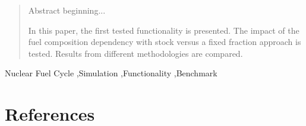 \documentclass[review]{elsarticle}
\begin{document}
\begin{frontmatter}
\begin{abstract}
Abstract beginning...


In this paper, the first tested functionality is presented. The impact of the fuel composition dependency with stock versus a fixed fraction approach is tested. Results from different methodologies are compared.
\end{abstract}

\begin{keyword}
Nuclear Fuel Cycle \sep Simulation \sep Functionality \sep Benchmark
\end{keyword}

\end{frontmatter}

\linenumbers







\section*{References}


\end{document}
